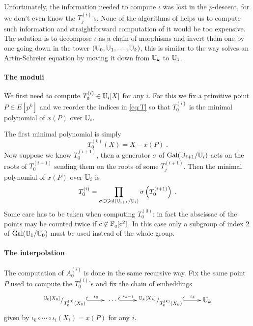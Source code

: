 Unfortunately, the information needed to compute $\iota$ was lost in
the $p$-descent, for we don't even know the $T_j^{(i)}$'s. None of the
algorithms of \cite{DFS09} helps us to compute such information and
straightforward computation of it would be too expensive. The solution
is to decompose $\iota$ as a chain of morphisms and invert them
one-by-one going down in the tower $(\mathbb{U}_0,\mathbb{U}_1,\ldots,\mathbb{U}_k)$, this is
similar to the way \cite{Cou00} solves an Artin-Schreier equation by
moving it down from $\mathbb{U}_k$ to $\mathbb{U}_1$.

\paragraph{The moduli}
We first need to compute $T_0^{(i)}\in\mathbb{U}_i[X]$ for any $i$. For this
we fix a primitive point $P\in E[p^k]$ and we reorder the indices in
\eqref{eq:T} so that $T_0^{(i)}$ is the minimal polynomial of $x(P)$
over $\mathbb{U}_i$.

The first minimal polynomial is simply
\begin{equation}
  \label{eq:T_0^k}
  T_0^{(k)}(X) = X - x(P)
  \;\text{.}
\end{equation}
Now suppose we know $T_0^{(i+1)}$, then a generator $\sigma$ of
$\operatorname{Gal}(\mathbb{U}_{i+1}/\mathbb{U}_i)$ acts on the roots of $T_0^{(i+1)}$ sending them
on the roots of some $T_j^{(i+1)}$. Then the
minimal polynomial of $x(P)$ over $\mathbb{U}_i$ is
\begin{equation}
  \label{eq:T_0^i}
  T_0^{(i)} = \prod_{\sigma\in\operatorname{Gal}(\mathbb{U}_{i+1}/\mathbb{U}_i)} \sigma\left(T_0^{(i+1)}\right)
  \;\text{.}
\end{equation}
Some care has to be taken when computing $T_0^{(0)}$: in fact the
abscissae of the points may be counted twice if
$c\not\in\mathbb{F}_q[c^2]$. In this case only a subgroup of index $2$ of
$\operatorname{Gal}(\mathbb{U}_1/\mathbb{U}_0)$ must be used instead of the whole group.


\paragraph{The interpolation}
The computation of $A_0^{(i)}$ is done in the same recursive way. Fix
the same point $P$ used to compute the $T_0^{(i)}$'s and fix the chain
of embeddings
\begin{equation}
  \xymatrix{
    ^{\U_0[X_0]}/_{T_0^{(0)}(X_0)} \ar@{^{(}->}[r]^-{\iota_0} &
    \;\cdots\; \ar@{^{(}->}[r]^-{\iota_{k-1}} &
    ^{\U_k[X_k]}/_{T_0^{(k)}(X_k)} \ar@{^{(}->}[r]^-{\iota_k} &
    \U_k
  }
\end{equation}
given by $\iota_k\circ\cdots\circ\iota_i(X_i) = x(P)$ for any $i$.

